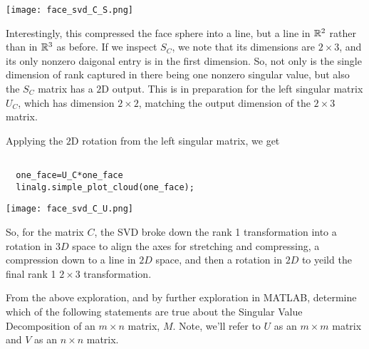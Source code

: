 \documentclass{ximera}
\begin{document}
\begin{problem}
\begin{problem}
\begin{center}
  \texttt{[image: face\_svd\_C\_S.png]}
\end{center}

Interestingly, this compressed the face sphere into a line, but a line in $\mathbb{R}^2$ rather than in $\mathbb{R}^3$ as before. If we inspect $S_C$, we note that its dimensions are $2\times 3$, and its only nonzero daigonal entry is in the first dimension. So, not only is the single dimension of rank captured in there being one nonzero singular value, but also the $S_C$ matrix has a $2$D output. This is in preparation for the left singular matrix $U_C$, which has dimension $2\times 2$, matching the output dimension of the $2\times 3$ matrix. 

Applying the $2$D rotation from the left singular matrix, we get

\begin{verbatim}

  one_face=U_C*one_face
  linalg.simple_plot_cloud(one_face);

\end{verbatim}

\begin{center}
  \texttt{[image: face\_svd\_C\_U.png]}
\end{center}

So, for the matrix $C$, the SVD broke down the rank 1 transformation into a rotation in $3D$ space to align the axes for stretching and compressing, a compression down to a line in $2D$ space, and then a rotation in $2D$ to yeild the final rank 1 $2\times 3$ transformation. 

\begin{problem}

  From the above exploration, and by further exploration in MATLAB, determine which of the following statements are true about the Singular Value Decomposition of an $m\times n$ matrix, $M$. Note, we'll refer to $U$ as an $m\times m$ matrix and $V$ as an $n\times n$ matrix.

  \begin{selectAll}
  

\end{selectAll}
\end{problem}
\end{problem}
\end{problem}
\end{document}
